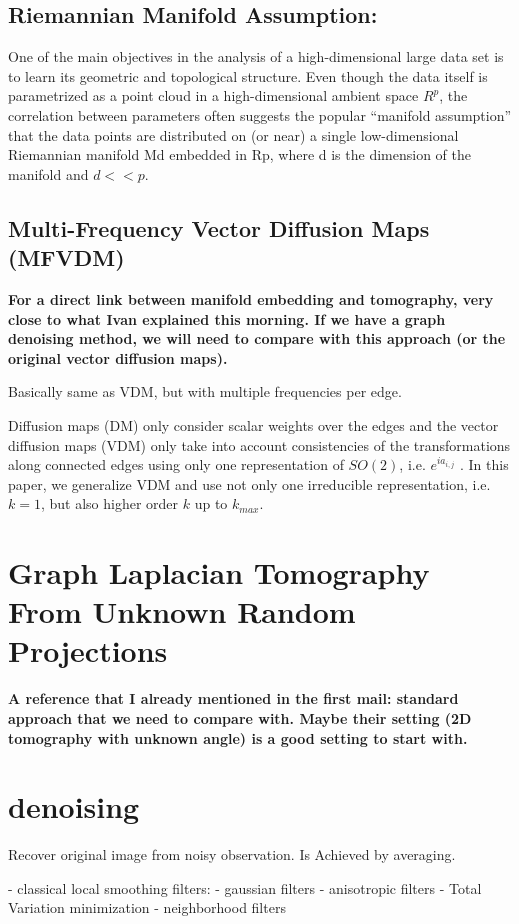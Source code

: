 \subsection{Riemannian Manifold Assumption:}
One of the main objectives in the analysis of a high-dimensional large data set
is to learn its geometric and topological structure. Even though the data itself is
parametrized as a point cloud in a high-dimensional ambient space $R^p$, the correlation
between parameters often suggests the popular “manifold assumption” that
the data points are distributed on (or near) a single low-dimensional Riemannian
manifold Md embedded in Rp, where d is the dimension of the manifold and
$d << p$.


\subsection{Multi-Frequency Vector Diffusion Maps (MFVDM)}
\cite{multiDiffusionMaps}
\textbf{For a direct link between manifold embedding and tomography, very close to what Ivan explained this morning.
If we have a graph denoising method, we will need to compare with this approach 
(or the original vector diffusion maps).}

Basically same as VDM, but with multiple frequencies per edge.

Diffusion maps (DM) only consider scalar weights over the edges and the vector
diffusion maps (VDM) only take into account consistencies
of the transformations along connected edges using only one
representation of $SO(2)$, i.e. $e^{ia_{i,j}}$ . In this paper, we generalize
VDM and use not only one irreducible representation,
i.e. $k = 1$, but also higher order $k$ up to $k_{max}$.


\section{Graph Laplacian Tomography From Unknown Random Projections}
\textbf{A reference that I already mentioned in the first mail:
standard approach that we need to compare with. 
Maybe their setting (2D tomography with unknown angle) is a good setting to start with.
}

\section{denoising}
Recover original image from noisy observation.
Is Achieved by averaging.

- classical local smoothing filters:
    - gaussian filters
    - anisotropic filters
    - Total Variation minimization
    - neighborhood filters

